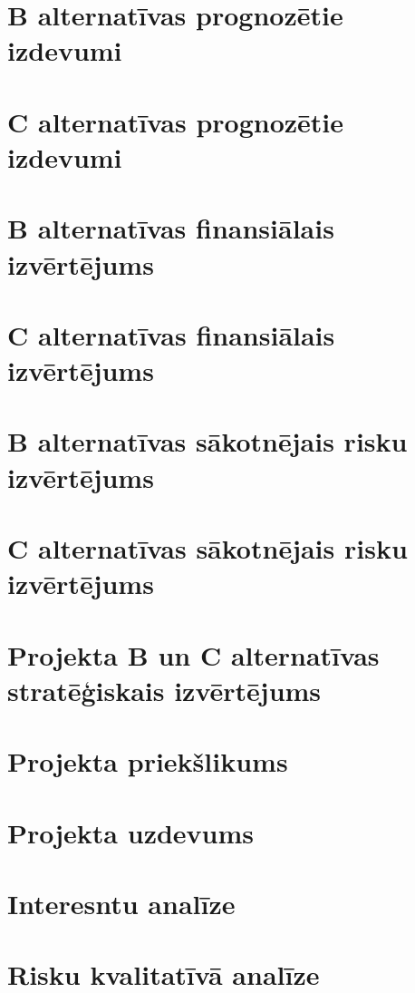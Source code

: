 \begin{appendices}
    \section{B alternatīvas prognozētie izdevumi}
    \label{app:pielikums10}
        \clearpage
    \section{C alternatīvas prognozētie izdevumi}
    \label{app:pielikums11}
        \clearpage
    \section{B alternatīvas finansiālais izvērtējums}
    \label{app:pielikums12}
        \clearpage
    \section{C alternatīvas finansiālais izvērtējums}
    \label{app:pielikums13}
        \clearpage
    \section{B alternatīvas sākotnējais risku izvērtējums}
    \label{app:pielikums14}
        \clearpage
    \section{C alternatīvas sākotnējais risku izvērtējums}
    \label{app:pielikums15}
        \clearpage
    \section{Projekta B un C alternatīvas stratēģiskais izvērtējums}
    \label{app:pielikums16}
        \clearpage
    \section{Projekta priekšlikums}
    \label{app:pielikums17}
        \clearpage
    \section{Projekta uzdevums}
    \label{app:pielikums18}
        \clearpage
    \section{Interesntu analīze}
    \label{app:pielikums19}
        \clearpage
    \section{Risku kvalitatīvā analīze}
    \label{app:pielikums20}
        \clearpage

\end{appendices}
